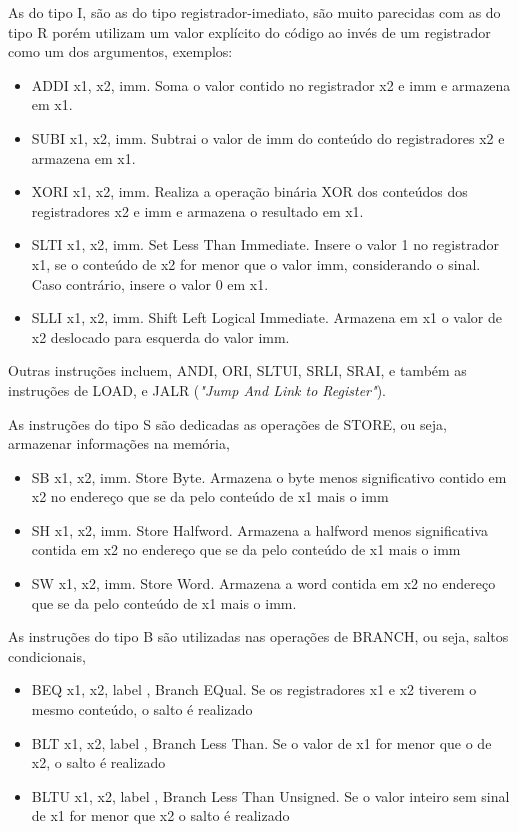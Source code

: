 		As do tipo I, são as do tipo registrador-imediato, são muito parecidas com as do tipo R porém utilizam um valor explícito do código ao invés de um registrador como um dos argumentos, exemplos:
		\begin{itemize}
			\item{ADDI x1, x2, imm. Soma o valor contido no registrador x2 e imm e armazena em x1.}
			\item{SUBI x1, x2, imm. Subtrai o valor de imm do conteúdo do registradores x2 e armazena em x1.}
			\item{XORI x1, x2, imm. Realiza a operação binária XOR dos conteúdos dos registradores x2 e imm e armazena o resultado em x1.}
			\item{SLTI x1, x2, imm. Set Less Than Immediate. Insere o valor 1 no registrador x1, se o conteúdo de x2 for menor que o valor imm, considerando o sinal. Caso contrário, insere o valor 0 em x1.}
			\item{SLLI x1, x2, imm. Shift Left Logical Immediate. Armazena em x1 o valor de x2 deslocado para esquerda do valor imm.}
		\end{itemize}
		Outras instruções incluem, ANDI, ORI, SLTUI, SRLI, SRAI, e também as instruções de LOAD, e JALR (\textit{"Jump And Link to Register"}).

		As instruções do tipo S são dedicadas as operações de STORE, ou seja, armazenar informações na memória,
		\begin{itemize}
			\item{SB x1, x2, imm. Store Byte. Armazena o byte menos significativo contido em x2 no endereço que se da pelo conteúdo de x1 mais o imm}
			\item{SH x1, x2, imm. Store Halfword. Armazena a halfword menos significativa contida em x2 no endereço que se da pelo conteúdo de x1 mais o imm}
			\item{SW x1, x2, imm. Store Word. Armazena a word contida em x2 no endereço que se da pelo conteúdo de x1 mais o imm.}
		\end{itemize}

		As instruções do tipo B são utilizadas nas operações de BRANCH, ou seja, saltos condicionais,
		\begin{itemize}
			\item{BEQ x1, x2, label , Branch EQual. Se os registradores x1 e x2 tiverem o mesmo conteúdo, o salto é realizado}
			\item{BLT x1, x2, label , Branch Less Than. Se o valor de x1 for menor que o de x2, o salto é realizado}
			\item{BLTU x1, x2, label , Branch Less Than Unsigned. Se o valor inteiro sem sinal de x1 for menor que x2 o salto é realizado }
		\end{itemize}

